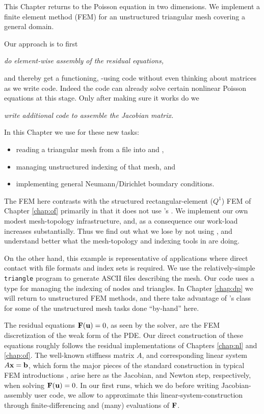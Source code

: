 
This Chapter returns to the Poisson equation in two dimensions.  We implement a finite element method (FEM) for an unstructured triangular mesh covering a general domain.

Our approach is to first
\begin{center}
\emph{do element-wise assembly of the residual equations,}
\end{center}
and thereby get a functioning, \pSNES-using code without even thinking about matrices as we write code.  Indeed the code can already solve certain nonlinear Poisson equations at this stage.  Only after making sure it works do we
\begin{center}
\emph{write additional code to assemble the Jacobian matrix.}
\end{center}

In this Chapter we use \PETSc for these new tasks:
\begin{itemize}
\item reading a triangular mesh from a file into \PETSc \pVecs and \pISs,
\item managing unstructured indexing of that mesh, and
\item implementing general Neumann/Dirichlet boundary conditions.
\end{itemize}

The FEM here contrasts with the structured rectangular-element ($Q^1$) FEM of Chapter \ref{chap:of} primarily in that it does not use \PETSc's \pDMDA.  We implement our own modest mesh-topology infrastructure, and, as a consequence our work-load increases substantially.  Thus we find out what we lose by not using \pDMDA, and understand better what the mesh-topology and indexing tools in \PETSc are doing.

On the other hand, this example is representative of \PETSc applications where direct contact with file formats and index sets is required.  We use the relatively-simple \texttt{triangle} program to generate ASCII files describing the mesh.  Our code uses a \PETSc \pIS type for managing the indexing of nodes and triangles.  In Chapter \ref{chap:dp} we will return to unstructured FEM methods, and there take advantage of \PETSc's \pDMPlex class for some of the unstructured mesh tasks done ``by-hand'' here.

The residual equations $\mathbf{F}(\mathbf{u})=0$, as seen by the \pSNES solver, are the FEM discretization of the weak form of the PDE.  Our direct construction of these equations roughly follows the residual implementations of Chapters \ref{chap:nl} and \ref{chap:of}.  The well-known stiffness matrix $A$, and corresponding linear system $A\mathbf{x} = \mathbf{b}$, which form the major pieces of the standard construction in typical FEM introductions \citep{Braess2007,Elmanetal2005}, arise here as the Jacobian, and Newton step, respectively, when solving $\mathbf{F}(\mathbf{u})=0$.  In our first runs, which we do before writing Jacobian-assembly user code, we allow \PETSc \pSNES to approximate this linear-system-construction through finite-differencing and (many) evaluations of $\mathbf{F}$.


